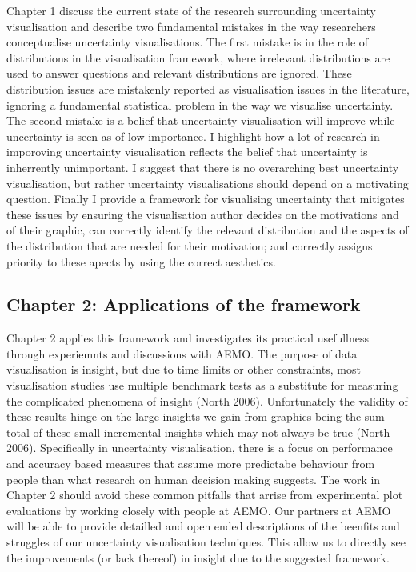 \documentclass[
  letterpaper,
  DIV=11,
  numbers=noendperiod]{scrartcl}
\begin{document}
Chapter 1 discuss the current state of the research surrounding
uncertainty visualisation and describe two fundamental mistakes in the
way researchers conceptualise uncertainty visualisations. The first
mistake is in the role of distributions in the visualisation framework,
where irrelevant distributions are used to answer questions and relevant
distributions are ignored. These distribution issues are mistakenly
reported as visualisation issues in the literature, ignoring a
fundamental statistical problem in the way we visualise uncertainty. The
second mistake is a belief that uncertainty visualisation will improve
while uncertainty is seen as of low importance. I highlight how a lot of
research in imporoving uncertainty visualisation reflects the belief
that uncertainty is inherrently unimportant. I suggest that there is no
overarching best uncertainty visualisation, but rather uncertainty
visualisations should depend on a motivating question. Finally I provide
a framework for visualising uncertainty that mitigates these issues by
ensuring the visualisation author decides on the motivations and of
their graphic, can correctly identify the relevant distribution and the
aspects of the distribution that are needed for their motivation; and
correctly assigns priority to these apects by using the correct
aesthetics.

\hypertarget{chapter-2-applications-of-the-framework}{%
\subsection{Chapter 2: Applications of the
framework}\label{chapter-2-applications-of-the-framework}}

Chapter 2 applies this framework and investigates its practical
usefullness through experiemnts and discussions with AEMO. The purpose
of data visualisation is insight, but due to time limits or other
constraints, most visualisation studies use multiple benchmark tests as
a substitute for measuring the complicated phenomena of insight (North
2006). Unfortunately the validity of these results hinge on the large
insights we gain from graphics being the sum total of these small
incremental insights which may not always be true (North 2006).
Specifically in uncertainty visualisation, there is a focus on
performance and accuracy based measures that assume more predictabe
behaviour from people than what research on human decision making
suggests. The work in Chapter 2 should avoid these common pitfalls that
arrise from experimental plot evaluations by working closely with people
at AEMO. Our partners at AEMO will be able to provide detailled and open
ended descriptions of the beenfits and struggles of our uncertainty
visualisation techniques. This allow us to directly see the improvements
(or lack thereof) in insight due to the suggested framework.
\end{document}
